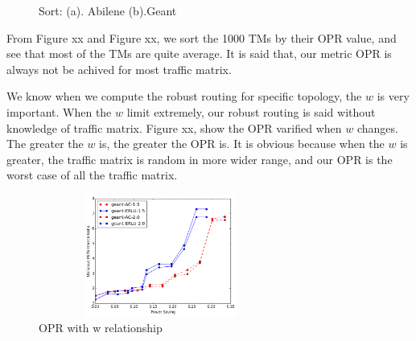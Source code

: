 \documentclass[conference]{IEEEtran}
\begin{document}
\begin{figure}[!t]
\centering
\vspace*{0.1in}
\caption{Sort: (a). Abilene (b).Geant}
\vspace*{0.1in}
\end{figure}

From Figure xx and Figure xx, we sort the 1000 TMs by their OPR value, and see that most of the TMs are quite average. 
It is said that, our metric OPR is always not be achived for most traffic matrix.


We know when we compute the robust routing for specific topology, the $w$ is very important. When the $w$ limit extremely,
our robust routing is said without knowledge of traffic matrix. Figure xx, show the OPR varified when $w$ changes. The greater
the $w$ is, the greater the OPR is. It is obvious because when the $w$ is greater, the traffic matrix is random in more wider 
range, and our OPR is the worst case of all the traffic matrix.

\begin{figure}
\centering
\vspace*{0.1in}
\includegraphics[width=8cm,height=4cm]{exp3_w}
\caption{OPR with w relationship}
\vspace*{0.1in}
\end{figure}
\end{document}
